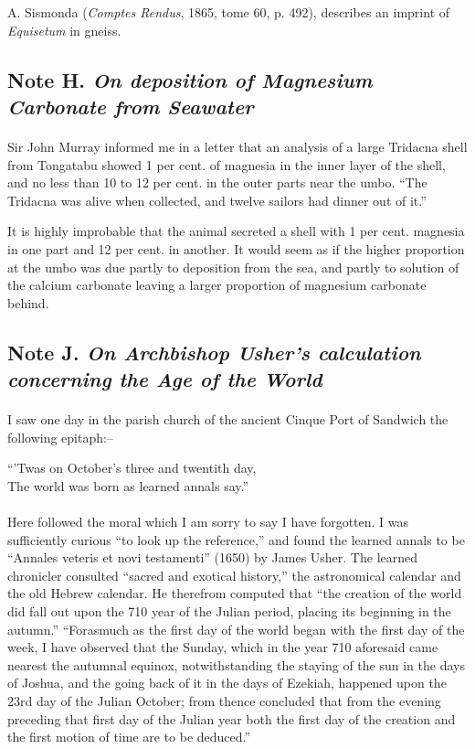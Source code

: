 \documentclass[a4paper, 12pt, oneside]{article}
\begin{document}
A. Sismonda (\emph{Comptes Rendus}, 1865, tome 60, p. 492), describes an imprint of \emph{Equisetum} in gneiss.

\subsection{Note H. \emph{On deposition of Magnesium Carbonate from Seawater}}
\paragraph{}
Sir John Murray informed me in a letter that an analysis of a large Tridacna shell from Tongatabu showed 1 per cent. of magnesia in the inner layer of the shell, and no less than 10 to 12 per cent. in the outer parts near the umbo. ``The Tridacna was alive when collected, and twelve sailors had dinner out of it.''

It is highly improbable that the animal secreted a shell with 1 per cent. magnesia in one part and 12 per cent. in another. It would seem as if the higher proportion at the umbo was due partly to deposition from the sea, and partly to solution of the calcium carbonate leaving a larger proportion of magnesium carbonate behind.

\subsection{Note J. \emph{On Archbishop Usher's calculation concerning the Age of the World}}
\paragraph{}
I saw one day in the parish church of the ancient Cinque Port of Sandwich the following epitaph:--
\begin{displayquote}
``'Twas on October's three and twentith day,\\The world was born as learned annals say.''
\end{displayquote}
\paragraph{}
Here followed the moral which I am sorry to say I have forgotten. I was sufficiently curious ``to look up the reference,'' and found the learned annals to be ``Annales veteris et novi testamenti'' (1650) by James Usher. The learned chronicler consulted ``sacred and exotical history,'' the astronomical calendar and the old Hebrew calendar. He therefrom computed that ``the creation of the world did fall out upon the 710 year of the Julian period, placing its beginning in the autumn.'' ``Forasmuch as the first day of the world began with the first day of the week, I have observed that the Sunday, which in the year 710 aforesaid came nearest the autumnal equinox, notwithstanding the staying of the sun in the days of Joshua, and the going back of it in the days of Ezekiah, happened upon the 23rd day of the Julian October; from thence concluded that from the evening preceding that first day of the Julian year both the first day of the creation and the first motion of time are to be deduced.''
\end{document}
